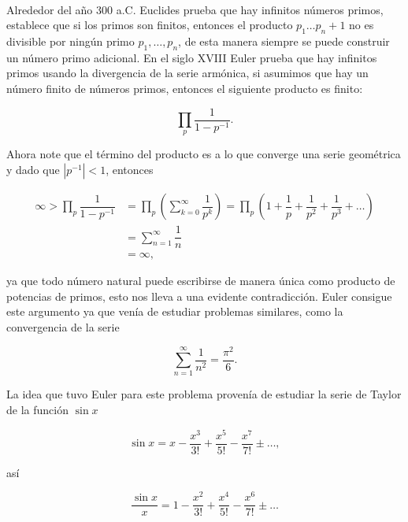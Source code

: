 
\thispagestyle{empty}
\vspace{-0.5cm}

\\

Alrededor del año 300 a.C. Euclides prueba que hay infinitos números primos, establece que si los primos son finitos, entonces el producto $p_1\ldots p_n+1$ no es divisible por ningún primo $p_1,\ldots,p_n$, de esta manera siempre se puede construir un número primo adicional. En el siglo XVIII Euler prueba que hay infinitos primos usando la divergencia de la serie armónica, si asumimos que hay un número finito de números primos, entonces el siguiente producto es finito:

$$\prod_p \dfrac{1}{1-p^{-1}}.$$

Ahora note que el término del producto es a lo que converge una serie geométrica y dado que $|p^{-1}|<1$, entonces

\begin{align*}
    \infty>\prod_p \dfrac{1}{1-p^{-1}}&=\prod_p \left(\sum_{k=0}^{\infty}\dfrac{1}{p^k}\right)=\prod_p \left(1+\dfrac{1}{p}+\dfrac{1}{p^2}+\dfrac{1}{p^3}+\ldots\right)\\
    &=\sum_{n=1}^{\infty}\dfrac{1}{n}\\
    &=\infty
,\end{align*}

ya que todo número natural puede escribirse de manera única como producto de potencias de primos, esto nos lleva a una evidente contradicción. Euler consigue este argumento ya que venía de estudiar problemas similares, como la convergencia de la serie

$$\sum_{n=1}^{\infty}\frac{1}{n^2}=\frac{\pi^2}{6}.$$

La idea que tuvo Euler para este problema provenía de estudiar la serie de Taylor de la función $\sin x$

$$\sin x=x-\frac{x^3}{3!}+\frac{x^5}{5!}-\frac{x^7}{7!}\pm \ldots,$$

así

$$\frac{\sin x}{x}=1-\frac{x^2}{3!}+\frac{x^4}{5!}-\frac{x^6}{7!}\pm\ldots$$

